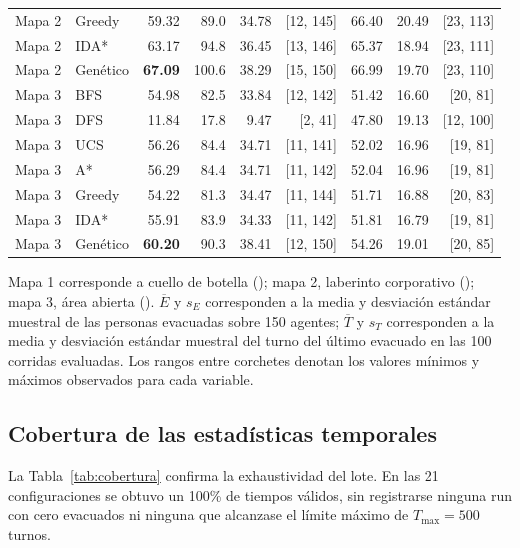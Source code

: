 \documentclass[11pt,letterpaper]{article}
\begin{document}
\begin{longtable}{@{}llrrrrrrr@{}}
Mapa 2 & Greedy   & 59.32 &  89.0 & 34.78 & [12, 145] & 66.40 & 20.49 & [23, 113] \\
Mapa 2 & IDA*     & 63.17 &  94.8 & 36.45 & [13, 146] & 65.37 & 18.94 & [23, 111] \\
Mapa 2 & Genético & \textbf{67.09} & 100.6 & 38.29 & [15, 150] & 66.99 & 19.70 & [23, 110] \\
\midrule
Mapa 3 & BFS      & 54.98 &  82.5 & 33.84 & [12, 142] & 51.42 & 16.60 & [20,  81] \\
Mapa 3 & DFS      & 11.84 &  17.8 &  9.47 &  [2,  41] & 47.80 & 19.13 & [12, 100] \\
Mapa 3 & UCS      & 56.26 &  84.4 & 34.71 & [11, 141] & 52.02 & 16.96 & [19,  81] \\
Mapa 3 & A*       & 56.29 &  84.4 & 34.71 & [11, 142] & 52.04 & 16.96 & [19,  81] \\
Mapa 3 & Greedy   & 54.22 &  81.3 & 34.47 & [11, 144] & 51.71 & 16.88 & [20,  83] \\
Mapa 3 & IDA*     & 55.91 &  83.9 & 34.33 & [11, 142] & 51.81 & 16.79 & [19,  81] \\
Mapa 3 & Genético & \textbf{60.20} &  90.3 & 38.41 & [12, 150] & 54.26 & 19.01 & [20,  85] \\
\end{longtable}
\normalsize
Mapa 1 corresponde a cuello de botella (); mapa 2, laberinto corporativo (); mapa 3, área abierta (). $\overline{E}$ y $s_E$ corresponden a la media y desviación estándar muestral de las personas evacuadas sobre 150 agentes; $\overline{T}$ y $s_T$ corresponden a la media y desviación estándar muestral del turno del último evacuado en las 100 corridas evaluadas. Los rangos entre corchetes denotan los valores mínimos y máximos observados para cada variable.

\subsection{Cobertura de las estadísticas temporales}
La Tabla~\ref{tab:cobertura} confirma la exhaustividad del lote. En las 21 configuraciones se obtuvo un 100\% de tiempos válidos, sin registrarse ninguna run con cero evacuados ni ninguna que alcanzase el límite máximo de $T_{\max}=500$ turnos.
\end{document}
